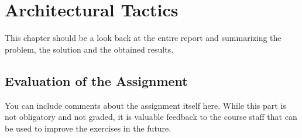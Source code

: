 \chapter{Architectural Tactics}
This chapter should be a look back at the entire report and summarizing the problem, the solution and the obtained results.

\section{Evaluation of the Assignment}
You can include comments about the assignment itself here. While this part is not obligatory and not graded, it is valuable feedback to the course staff that can be used to improve the exercises in the future.